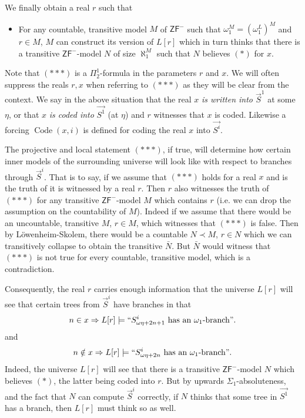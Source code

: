 \documentclass[a4paper,11pt]{article}
\newcommand{\ZFP}{\mathsf{ZF}^-}
\begin{document}
{We finally obtain a real \(r\) such that 
\begin{itemize}
\item[$({\ast}{\ast}{\ast})$] For any countable, transitive model $M$ of $\ZFP$ such that $\omega_1^M=(\omega_1^L)^M$ and $ r  \in M$, $M$ can construct its version of $L[r]$ which in turn thinks that there is a transitive $\ZFP$-model $N$ of size $\aleph_1^M$  such that $N$ believes $(\ast)$ for $x$.
\end{itemize}
Note that $({\ast} {\ast} {\ast})$ is a $\Pi^1_2$-formula in the parameters $r$ and $x$. We will often suppress the reals $r,x$ when referring to $({\ast} {\ast} {\ast})$ as they will be clear from the context. We say in the above situation that the real $x$ \emph{ is written into $\vec{S}^1$} at some $\eta$, or that $x$ \emph{is coded into} $\vec{S^1}$ (at $\eta$) and $r$ witnesses that $x$ is coded. Likewise a forcing $\operatorname{Code} (x,i)$ is defined for coding the real $x$ into $\vec{S^i}$.

 
 The projective and local statement $({\ast} { \ast} {\ast} )$, if true,  will determine how certain inner models of the surrounding universe will look like with respect to branches through $\vec{S}^i$.
That is to say, if we assume that $({\ast} { \ast} {\ast} )$ holds for a real $x$ and is the truth of it is witnessed by a real $r$. Then $r$ also witnesses the truth of $({\ast} { \ast} {\ast} )$ for any transitive $\ZFP$-model $M$ which contains $r$ (i.e. we can drop the assumption on the countability of $M$).
Indeed if we assume 
that there would be an uncountable, transitive $M$, $r \in M$, which witnesses that $({\ast} { \ast} {\ast} )$ is false. Then by L\"owenheim-Skolem, there would be a countable $N\prec M$, $r\in N$ which we can transitively collapse to obtain the transitive $\bar{N}$. But $\bar{N}$ would witness that $({\ast} { \ast} {\ast} )$ is not true for every countable, transitive model, which is a contradiction.

Consequently, the real $r$ carries enough information that
the universe $L[r]$ will see that certain trees from $\vec{S}^i$ have branches in that
\begin{align*}
n \in x \Rightarrow L[r] \models  ``S^i_{\omega \eta + 2n+1} \text{ has an $\omega_1$-branch}".
\end{align*}
and
\begin{align*}
n \notin x\Rightarrow L[r] \models ``S^i_{\omega \eta + 2n} \text{ has an $\omega_1$-branch}".
\end{align*}
Indeed, the universe $L[r]$ will see that there is a transitive $\ZFP$-model $N$ which believes $(\ast)$, the latter being coded into $r$. But by upwards $\Sigma_1$-absoluteness, and the fact that $N$ can compute $\vec{S}^i$ correctly, if $N$ thinks that some tree in $\vec{S^1}$ has a branch, then $L[r]$ must think so as well.


}
\end{document}
